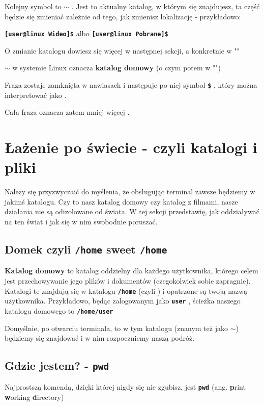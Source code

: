 \documentclass[12pt]{article}
\newcommand{\ttbf}[1]{
    \texttt{\textbf{#1}}
}
\begin{document}
Kolejny symbol to \ttbf{$\sim$}. Jest to aktualny katalog, w którym się znajdujesz, ta część będzie się zmieniać zależnie od tego, jak zmienisz lokalizację - przykładowo:

\ttbf{[user@linux Wideo]\$} albo \ttbf{[user@linux Pobrane]\$}

O zmianie katalogu dowiesz się więcej w następnej sekcji, a konkretnie w ""

\ttbf{$\sim$} w systemie Linux oznacza \textbf{katalog domowy} (o czym potem w "")

Fraza zostaje zamknięta w nawiasach i następuje po niej symbol \ttbf{\$}, który można interpretować jako .

Cała fraza oznacza zatem mniej więcej .

\section{Łażenie po świecie - czyli katalogi i pliki}

Należy się przyzwyczaić do myślenia, że obsługując terminal zawsze będziemy w jakimś katalogu. Czy to nasz katalog domowy czy katalog z filmami, nasze działania nie są odizolowane od świata. W tej sekcji przedstawię, jak oddziaływać na ten świat i jak się w nim swobodnie poruszać.

\subsection{Domek czyli \texttt{/home} sweet \texttt{/home}}
\label{sec:homedir}

\textbf{Katalog domowy} to katalog oddzielny dla każdego użytkownika, którego celem jest przechowywanie jego plików i dokumentów (czegokolwiek sobie zapragnie). Katalogi te znajdują się w katalogu \ttbf{/home} (czyli ) i opatrzone są twoją nazwą użytkownika. Przykładowo, będąc zalogowanym jako \ttbf{user}, ścieżka naszego katalogu domowego to \ttbf{/home/user}

Domyślnie, po otwarciu terminala, to w tym katalogu (znanym też jako $\sim$) będziemy się znajdować i w nim rozpoczniemy naszą podróż.

\subsection{Gdzie jestem? - \texttt{pwd}}

Najprostszą komendą, dzięki której nigdy się nie zgubisz, jest \ttbf{pwd} (ang. \textbf{p}rint \textbf{w}orking \textbf{d}irectory)
\end{document}
